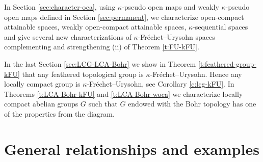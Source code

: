 \documentclass[preprint,11pt]{elsarticle}
\def\dag-{$\kappa$-pseudo open }
\numberwithin{equation}{section}
\numberwithin{theorem}{section}
\newcommand{\NN}{\mathbb{N}}
\begin{document}
In Section \ref{sec:character-oca}, using \dag-maps and weakly \dag-maps defined in Section \ref{sec:permanent}, we characterize  open-compact attainable spaces, weakly open-compact attainable spaces, $\kappa$-sequential spaces and give several new characterizations of $\kappa$-Fr\'{e}chet--Urysohn spaces complementing and strengthening (ii) of Theorem \ref{t:FU-kFU}.
\smallskip

In the last Section \ref{sec:LCG-LCA-Bohr} we show in Theorem \ref{t:feathered-group-kFU} that any feathered topological group is  $\kappa$-Fr\'{e}chet--Urysohn. Hence any locally compact group is $\kappa$-Fr\'{e}chet--Urysohn, see Corollary \ref{c:lcg-kFU}. In Theorems \ref{t:LCA-Bohr-kFU} and \ref{t:LCA-Bohr-woca} we characterize locally compact abelian groups $G$ such that $G$ endowed with the Bohr topology has one of the properties from the diagram.





\section{General relationships and examples} \label{sec:RE}

\end{document}
